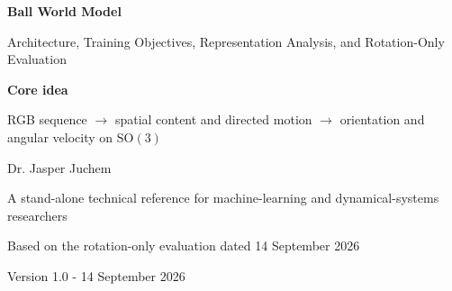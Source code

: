 \documentclass[11pt,a4paper]{article}
\newcommand{\SO}{\mathrm{SO}}
\begin{document}
\begin{titlepage}
\centering
\vspace*{22mm}
{\Huge\bfseries\color{reportblue} Ball World Model\par}
\vspace{5mm}
{\LARGE Architecture, Training Objectives, Representation Analysis, and Rotation-Only Evaluation\par}
\vspace{18mm}
\begin{tcolorbox}[width=.86\textwidth,colback=reportgray,colframe=reportblue,boxrule=.8pt]
\centering\large
\textbf{Core idea}\par\medskip
RGB sequence $\rightarrow$ spatial content and directed motion $\rightarrow$ orientation and angular velocity on $\SO(3)$
\end{tcolorbox}
\vfill
{\Large Dr. Jasper Juchem\par}
\vspace{4mm}
{\large A stand-alone technical reference for machine-learning and dynamical-systems researchers\par}
\vspace{12mm}
{\large Based on the rotation-only evaluation dated 14 September 2026\par}
{\large Version 1.0 - 14 September 2026\par}
\end{titlepage}
\end{document}
